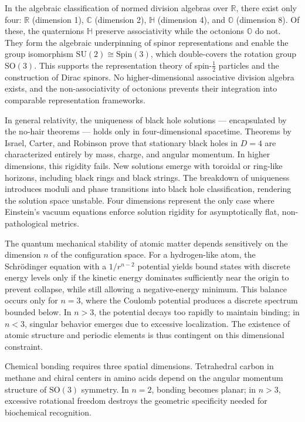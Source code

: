 In the algebraic classification of normed division algebras over $\mathbb{R}$, there exist only four: $\mathbb{R}$ (dimension 1), $\mathbb{C}$ (dimension 2), $\mathbb{H}$ (dimension 4), and $\mathbb{O}$ (dimension 8). Of these, the quaternions $\mathbb{H}$ preserve associativity while the octonions $\mathbb{O}$ do not. They form the algebraic underpinning of spinor representations and enable the group isomorphism $\mathrm{SU}(2) \cong \mathrm{Spin}(3)$, which double-covers the rotation group $\mathrm{SO}(3)$. This supports the representation theory of spin-$\tfrac{1}{2}$ particles and the construction of Dirac spinors. No higher-dimensional associative division algebra exists, and the non-associativity of octonions prevents their integration into comparable representation frameworks.

In general relativity, the uniqueness of black hole solutions — encapsulated by the no-hair theorems — holds only in four-dimensional spacetime. Theorems by Israel, Carter, and Robinson prove that stationary black holes in $D=4$ are characterized entirely by mass, charge, and angular momentum. In higher dimensions, this rigidity fails. New solutions emerge with toroidal or ring-like horizons, including black rings and black strings. The breakdown of uniqueness introduces moduli and phase transitions into black hole classification, rendering the solution space unstable. Four dimensions represent the only case where Einstein’s vacuum equations enforce solution rigidity for asymptotically flat, non-pathological metrics.

The quantum mechanical stability of atomic matter depends sensitively on the dimension $n$ of the configuration space. For a hydrogen-like atom, the Schrödinger equation with a $1/r^{n-2}$ potential yields bound states with discrete energy levels only if the kinetic energy dominates sufficiently near the origin to prevent collapse, while still allowing a negative-energy minimum. This balance occurs only for $n=3$, where the Coulomb potential produces a discrete spectrum bounded below. In $n>3$, the potential decays too rapidly to maintain binding; in $n<3$, singular behavior emerges due to excessive localization. The existence of atomic structure and periodic elements is thus contingent on this dimensional constraint.

Chemical bonding requires three spatial dimensions. Tetrahedral carbon in methane and chiral centers in amino acids depend on the angular momentum structure of $\mathrm{SO}(3)$ symmetry. In $n=2$, bonding becomes planar; in $n>3$, excessive rotational freedom destroys the geometric specificity needed for biochemical recognition.

